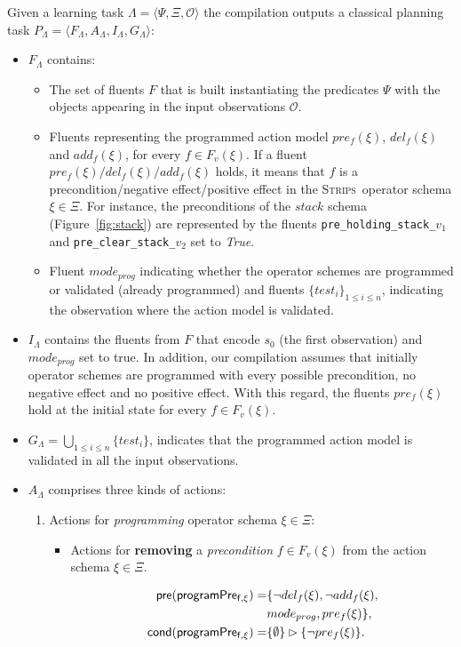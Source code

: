 \documentclass{article}
\newcommand{\tup}[1]{{\langle #1 \rangle}}
\newcommand{\pre}{\mathsf{pre}}     %
\newcommand{\cond}{\mathsf{cond}}   %
\newcommand{\strips}{\textsc{Strips}}     %
\begin{document}
Given a learning task $\Lambda=\tup{\Psi,\Xi,\mathcal{O}}$ the compilation outputs a classical planning task $P_{\Lambda}=\tup{F_{\Lambda},A_{\Lambda},I_{\Lambda},G_{\Lambda}}$:
\begin{itemize}
\item $F_{\Lambda}$ contains:
\begin{itemize}
\item The set of fluents $F$ that is built instantiating the predicates $\Psi$ with the objects appearing in the input observations $\mathcal{O}$. 
\item Fluents representing the programmed action model $pre_f(\xi)$, $del_f(\xi)$ and $add_f(\xi)$, for every $f\in F_v(\xi)$. If a fluent $pre_f(\xi)/del_f(\xi)/add_f(\xi)$ holds, it means that $f$ is a precondition/negative effect/positive effect in the \strips\ operator schema $\xi\in \Xi$. For instance, the preconditions of the $stack$ schema (Figure~\ref{fig:stack}) are represented by the fluents {\small\tt pre\_holding\_stack\_$v_1$} and {\small\tt pre\_clear\_stack\_$v_2$} set to {\em True}.
\item Fluent $mode_{prog}$ indicating whether the operator schemes are programmed or validated (already programmed) and fluents $\{test_i\}_{1\leq i\leq n}$, indicating the observation where the action model is validated.
\end{itemize}
\item $I_{\Lambda}$ contains the fluents from $F$ that encode $s_0$ (the first observation) and $mode_{prog}$ set to true. In addition, our compilation assumes that initially operator schemes are programmed with every possible precondition, no negative effect and no positive effect. With this regard, the fluents $pre_f(\xi)$ hold at the initial state for every $f\in F_v(\xi)$.
\item $G_{\Lambda}=\bigcup_{1\leq i\leq n}\{test_i\}$, indicates that the programmed action model is validated in all the input observations.
\item $A_{\Lambda}$ comprises three kinds of actions:
\begin{enumerate}
\item Actions for {\em programming} operator schema $\xi\in\Xi$:
\begin{itemize}
\item Actions for {\bf removing} a {\em precondition} $f\in F_v(\xi)$ from the action schema $\xi\in\Xi$.

\begin{small}
\begin{align*}
\hspace*{7pt}\pre(\mathsf{programPre_{f,\xi}})=&\{\neg del_{f}(\xi),\neg add_{f}(\xi),\\
& mode_{prog}, pre_{f}(\xi)\},\\
\cond(\mathsf{programPre_{f,\xi}})=&\{\emptyset\}\rhd\{\neg pre_{f}(\xi)\}.
\end{align*}
\end{small}


\end{itemize}
\end{enumerate}
\end{itemize}
\end{document}
